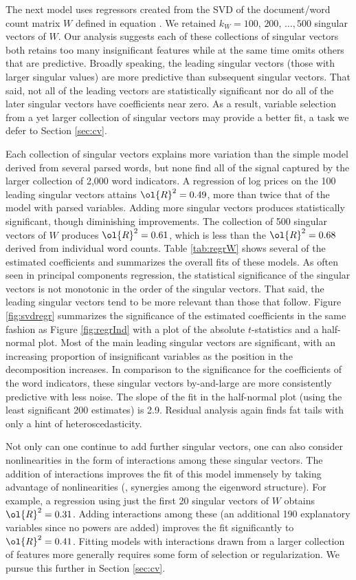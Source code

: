 \documentclass[12pt]{article}
\begin{document}
 
 The next model uses regressors created from the SVD of the document/word
 count matrix $W$ defined in equation .  We retained $k_W = 100,\, 200, \, \ldots, 500$ singular vectors of $W$.   Our analysis suggests each of these collections of singular vectors both retains too many insignificant features while at the same time omits others that are predictive.  Broadly speaking, the leading singular vectors (those with larger singular values) are more predictive than subsequent singular vectors.  That said, not all of the leading vectors are statistically significant nor do all of the later singular vectors have coefficients near zero.   As a result, variable selection from a yet larger collection of singular vectors may provide a better fit, a task we defer to Section \ref{sec:cv}.  
 

Each collection of singular vectors explains more variation than the simple model derived from several parsed words, but none find all of the signal captured by the larger collection of 2,000 word indicators.  A regression of log prices on the 100 leading singular vectors attains $\ol{R}^2 = 0.49$, more than twice that of the model with parsed variables.  Adding more singular vectors produces statistically significant, though diminishing improvements.  The collection of 500 singular vectors of $W$ produces $\ol{R}^2 = 0.61$, which is less than the $\ol{R}^2 = 0.68$ derived from individual word counts.  Table \ref{tab:regrW}  shows several of the estimated coefficients and summarizes the overall fits of these models.  As often seen in principal components regression, the statistical significance of the singular vectors is not monotonic in the order of the singular vectors. That said, the leading singular vectors tend to be more relevant than those that follow. Figure \ref{fig:svdregr} summarizes the significance of the estimated coefficients in the same fashion as Figure \ref{fig:regrInd} with a plot of the absolute $t$-statistics and a half-normal plot. Most of the main leading singular vectors are significant, with an increasing proportion of insignificant variables as the position in the decomposition increases.  In comparison to the significance for the coefficients of the word indicators, these singular vectors by-and-large are more consistently predictive with less noise.  The slope of the fit in the half-normal plot (using the least significant 200 estimates) is 2.9.  Residual analysis again finds fat tails with only a hint of heteroscedasticity.
 
 
 Not only can one continue to add further singular vectors, one can also consider nonlinearities in the form of interactions among these singular vectors.  The addition of interactions improves the fit of this model immensely by taking advantage of nonlinearities (\ie, synergies among the eigenword structure).  For example, a regression using just the first 20 singular vectors of $W$ obtains $\ol{R}^2 = 0.31$.  Adding interactions among these (an additional 190 explanatory variables since no powers are added) improves the fit significantly to $\ol{R}^2 = 0.41$.  Fitting models with interactions drawn from a larger collection of features more generally requires some form of selection or regularization.  We pursue this further in Section \ref{sec:cv}.
 
\end{document}
